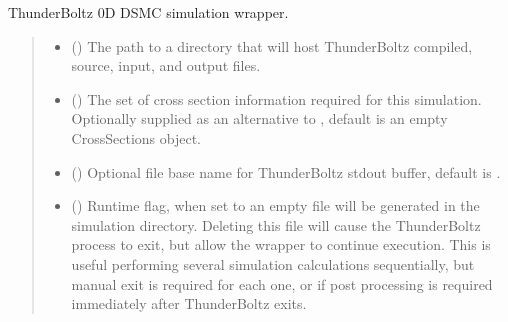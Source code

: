 \documentclass[letterpaper,10pt,english,openany,oneside]{sphinxmanual}
\begin{document}
\begin{fulllineitems}
\label{\detokenize{api/pytb.ThunderBoltz:pytb.ThunderBoltz}}
\pysigstartsignatures
{}
\pysigstopsignatures
\sphinxAtStartPar
ThunderBoltz 0D DSMC simulation wrapper.
\begin{quote}\begin{description}
\begin{itemize}
\item {} 
\sphinxAtStartPar
{} () \textendash{} The path to a directory that will host
ThunderBoltz compiled, source, input, and output files.

\item {} 
\sphinxAtStartPar
{} ({\hyperref[\detokenize{api/pytb.CrossSections:pytb.CrossSections}]{}}) \textendash{} The set of cross section information
required for this simulation. Optionally supplied as an alternative
to , default is an empty CrossSections object.

\item {} 
\sphinxAtStartPar
{} () \textendash{} Optional file base name for ThunderBoltz stdout buffer,
default is .

\item {} 
\sphinxAtStartPar
{} () \textendash{} Runtime flag, when set to  an empty 
file will be generated in the simulation directory.
Deleting this file will cause the ThunderBoltz process to exit,
but allow the wrapper to continue execution. This is useful
performing several simulation calculations sequentially,
but manual exit is required for each one, or if post processing
is required immediately after ThunderBoltz exits.


\end{itemize}
\end{description}
\end{quote}
\end{fulllineitems}
\end{document}
